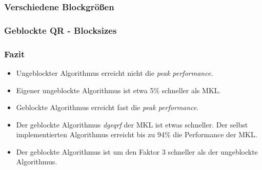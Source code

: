 

\begin{frame}
\frametitle{Verschiedene Blockgrößen}
		\centering
\end{frame}

\begin{frame}
\frametitle{Geblockte QR - Blocksizes}
	\centering
\end{frame}

\begin{frame}
\frametitle{Fazit}
\centering
\begin{itemize}
	\item Ungeblockter Algorithmus erreicht nicht die \textit{peak performance}.
	\item Eigener ungeblockte Algorithmus ist etwa 5\% schneller als MKL.
	\item Geblockte Algorithmus erreicht fast die \textit{peak performance}.
	\item Der geblockte Algorithmus \textit{dgeqrf} der MKL ist etwas schneller. Der selbst implementierten Algorithmus erreicht bis zu 94\% die Performance der MKL.
	\item Der geblockte Algorithmus ist um den Faktor 3 schneller als der ungeblockte Algorithmus.
\end{itemize}
\end{frame}




